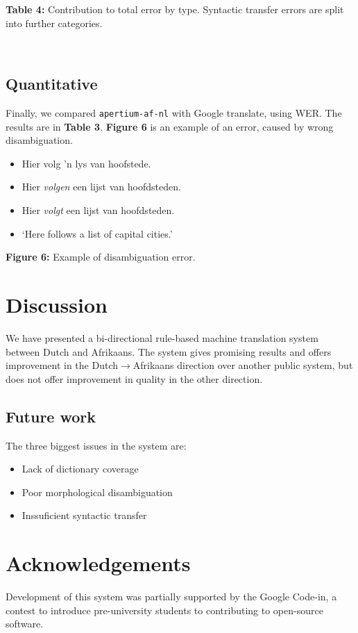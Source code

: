 \documentclass[a0,landscape]{a0poster}
\begin{document}
\begin{multicols}{4}
\begin{minipage}[b]{25cm}
\begin{center}
  \end{center}  
     \textbf{Table 4:} Contribution to total error by type. Syntactic transfer errors are split into 
      further categories.
    
\end{minipage}\\

\subsection{Quantitative}
Finally, we compared {\small {\tt apertium-af-nl}} with Google translate, using WER. The results 
are in {\bf Table 3}. {\bf Figure 6} is an example of an error, caused by wrong disambiguation. \\

\begin{itemize}
    \item[] Hier volg 'n lys van hoofstede. 
    \item[] Hier {\em volgen} een lijst van hoofdsteden. 
    \item[] Hier {\em volgt} een lijst van hoofdsteden.  
    \item[] `Here follows a list of capital cities.' 
\end{itemize}
\textbf{Figure 6:} Example of disambiguation error.

\section{Discussion}
We have presented a bi-directional rule-based machine translation system between Dutch and Afrikaans.
The system gives promising results and offers improvement in the Dutch$\rightarrow$Afrikaans direction
over another public system, but does not offer improvement in quality in the other direction.

\subsection{Future work}
The three biggest issues in the system are:
\begin{itemize}
 \item Lack of dictionary coverage
 \item Poor morphological disambiguation
 \item Inssuficient syntactic transfer
\end{itemize}

\section*{Acknowledgements}
Development of this system was partially supported by the Google Code-in,
a contest to introduce pre-university students to contributing to open-source
software. 



\end{multicols}
\end{document}
